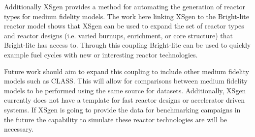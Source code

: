 \documentclass{article}
\begin{document}
Additionally XSgen provides a method for automating the generation of reactor types for medium fidelity models. The work here linking XSgen to the Bright-lite reactor model shows that XSgen can be used to expand the set of reactor types and reactor designs (i.e. varied burnups, enrichment, or core structure) that Bright-lite has access to. Through this coupling Bright-lite can be used to quickly example fuel cycles with new or interesting reactor technologies.

Future work should aim to expand this coupling to include other medium fidelity models such as CLASS. This will allow for comparisons between medium fidelity models to be performed using the same source for datasets. Additionally, XSgen currently does not have a template for fast reactor designs or accelerator driven systems. If XSgen is going to provide the data for benchmarking campaigns in the future the capability to simulate these reactor technologies are will be necessary.




\end{document}
